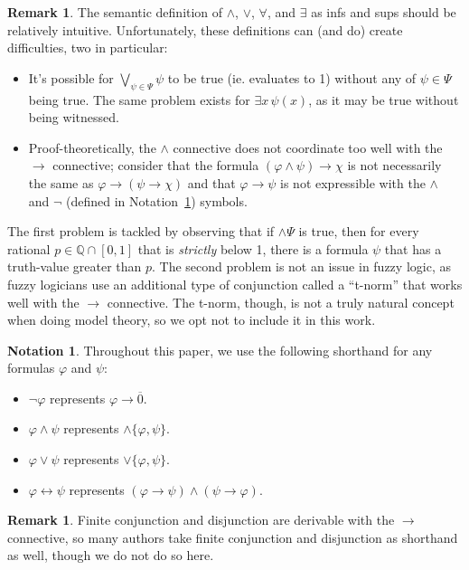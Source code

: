 \documentclass{amsart}
\theoremstyle{definition}
\newtheorem{remark}[theorem]{Remark}
\newtheorem{notation}[theorem]{Notation}
\numberwithin{equation}{theorem}
\renewcommand{\phi}{\varphi}
\newcommand{\Q}{\mathbb{Q}}
\newcommand{\unvee}{{\vee}}
\newcommand{\unwedge}{{\wedge}}
\newcommand{\rat}[1]{{\overline{#1}}}
\newcommand{\narrow}[1]{\xrightarrow{#1}}
\renewcommand{\to}{\narrow{}}
\begin{document}
\begin{remark}\label{rem:issues}
  The semantic definition of $\unwedge$, $\unvee$, $\forall$, and $\exists$ as infs and sups should be relatively intuitive.
  Unfortunately, these definitions can (and do) create difficulties, two in particular:
  \begin{itemize}
  \item 
    It's possible for $\bigvee_{\psi\in\Psi}\psi$ to be true (ie. evaluates to 1) without any of $\psi\in\Psi$ being true.
    The same problem exists for $\exists x\,\psi(x)$, as it may be true without being witnessed.
  \item
    Proof-theoretically, the $\wedge$ connective does not coordinate too well with the $\to$ connective; consider that the formula $(\phi\wedge\psi)\to\chi$ is not necessarily the same as $\phi\to(\psi\to\chi)$ and that $\phi\to\psi$ is not expressible with the $\wedge$ and $\neg$ (defined in Notation~\ref{not:shorthand}) symbols.
  \end{itemize}
  The first problem is tackled by observing that if $\unwedge\Psi$ is true, then for every rational $p\in\Q\cap[0,1]$ that is \emph{strictly} below 1, there is a formula $\psi$ that has a truth-value greater than $p$.
  The second problem is not an issue in fuzzy logic, as fuzzy logicians use an additional type of conjunction called a ``t-norm'' that works well with the $\to$ connective.
  The t-norm, though, is not a truly natural concept when doing model theory, so we opt not to include it in this work.
\end{remark}
\begin{notation}\label{not:shorthand}
  Throughout this paper, we use the following shorthand for any formulas $\phi$ and $\psi$:
  \begin{itemize}
  \item $\neg\phi$ represents $\phi\to\rat 0$.
  \item $\phi\wedge\psi$ represents $\unwedge\{\phi,\psi\}$.
  \item $\phi\vee\psi$ represents $\unvee\{\phi,\psi\}$.
  \item $\phi\leftrightarrow\psi$ represents $(\phi\to\psi)\wedge(\psi\to\phi)$.
  \end{itemize}
\end{notation}
\begin{remark}
  Finite conjunction and disjunction are derivable with the $\to$ connective, so many authors take finite conjunction and disjunction as shorthand as well, though we do not do so here.
\end{remark}
\end{document}
